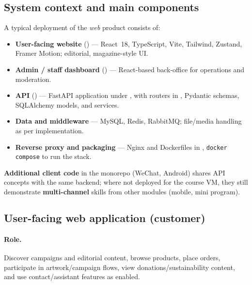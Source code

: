 \documentclass[11pt,a4paper]{article}
\begin{document}
\subsection{System context and main components}

A typical deployment of the \emph{web} product consists of:
\begin{itemize}
  \item \textbf{User-facing website} () --- React~18, TypeScript, Vite, Tailwind, Zustand, Framer Motion; editorial, magazine-style UI.
  \item \textbf{Admin / staff dashboard} () --- React-based back-office for operations and moderation.
  \item \textbf{API} () --- FastAPI application under , with routers in , Pydantic schemas, SQLAlchemy models, and services.
  \item \textbf{Data and middleware} --- MySQL, Redis, RabbitMQ; file/media handling as per implementation.
  \item \textbf{Reverse proxy and packaging} --- Nginx and Dockerfiles in , \texttt{docker compose} to run the stack.
\end{itemize}

\noindent
\textbf{Additional client code} in the monorepo (WeChat, Android) shares API concepts with the same backend; where not deployed for the course VM, they still demonstrate \textbf{multi-channel} skills from other modules (mobile, mini program).

\subsection{User-facing web application (customer)}

\paragraph{Role.}
Discover campaigns and editorial content, browse products, place orders, participate in artwork/campaign flows, view donations/sustainability content, and use contact/assistant features as enabled.
\end{document}
